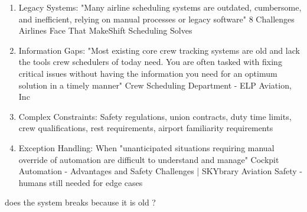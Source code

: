 \begin{botresponse}
\begin{enumerate}
\item Legacy Systems: "Many airline scheduling systems are outdated, cumbersome, and inefficient, relying on manual processes or legacy software" 8 Challenges Airlines Face That MakeShift Scheduling Solves
\item Information Gaps: "Most existing core crew tracking systems are old and lack the tools crew schedulers of today need. You are often tasked with fixing critical issues without having the information you need for an optimum solution in a timely manner" Crew Scheduling Department - ELP Aviation, Inc
\item Complex Constraints: Safety regulations, union contracts, duty time limits, crew qualifications, rest requirements, airport familiarity requirements
\item Exception Handling: When "unanticipated situations requiring manual override of automation are difficult to understand and manage" Cockpit Automation - Advantages and Safety Challenges | SKYbrary Aviation Safety - humans still needed for edge cases
\end{enumerate}
\end{botresponse}

\begin{userprompt}
does the system breaks because it is old ?
\end{userprompt}

